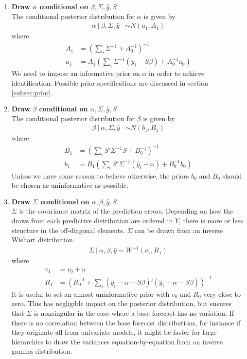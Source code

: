 \documentclass[a4paper,fleqn,11pt]{article}
\begin{document}
\begin{enumerate}
\item \textbf{Draw $\alpha$ conditional on $\beta,\Sigma,\hat{y},S$}\\
The conditional posterior distribution for $\alpha$ is given by
\begin{align}
	\label{eq:alpha}
\alpha\ |\ \beta,\Sigma,\hat{y} &\sim N(a_1,A_1)
\end{align}
where
\begin{align*}
A_1 &= \left(\sum_i \Sigma^{-1} + A_0^{-1}\right)^{-1} \\
a_1 &= A_1 \left(\sum_i \Sigma^{-1} (\hat{y}_i - S\beta) + A_0^{-1}a_0\right)
\end{align*}
We need to impose an informative prior on $\alpha$ in order to achieve identification. Possible prior specifications are discussed in section \ref{subsec:prior}.\\

\item \textbf{Draw $\beta$ conditional on $\alpha,\Sigma,\hat{y},S$}\\
The conditional posterior distribution for $\beta$ is given by
\begin{align}
\beta\ |\ \alpha,\Sigma,\hat{y} &\sim N(b_1,B_1)
\end{align}
where
\begin{align*}
B_1 &= \left(\sum_i S'\Sigma^{-1}S + B_0^{-1}\right)^{-1} \\
b_1 &= B_1 \left(\sum_i S'\Sigma^{-1} (\hat{y}_i - \alpha) + B_0^{-1}b_0\right)
\end{align*}
Unless we have some reason to believe otherwise, the priors $b_0$ and $B_0$ should be chosen as uninformative as possible. \\

\item \textbf{Draw $\Sigma$ conditional on $\alpha,\beta,\hat{y},S$}\\
$\Sigma$ is the covariance matrix of the prediction errors. Depending on how the draws from each predictive distribution are ordered in $Y$, there is more or less structure in the off-diagonal elements. $\Sigma$ can be drawn from an inverse Wishart distribution.
\begin{align}
\Sigma\ |\ \alpha,\beta,\hat{y} \sim W^{-1}(v_1,R_1)
\end{align}
where
\begin{align*}
v_1 &= v_0 + n\\
R_1 &=  \left( R_0^{-1} + \sum_i (\hat{y}_i - \alpha - S \beta)'(\hat{y}_i - \alpha - S \beta) \right)^{-1}
\end{align*}
It is useful to set an almost uninformative prior with $v_0$ and $R_0$ very close to zero. This has negligible impact on the posterior distribution, but ensures that $\Sigma$ is nonsingular in the case where a base forecast has no variation. If there is no correlation between the base forecast distributions, for instance if they originate all from univariate models, it might be faster for large hierarchies to draw the variances equation-by-equation from an inverse gamma distribution. 

\end{enumerate}
\end{document}
